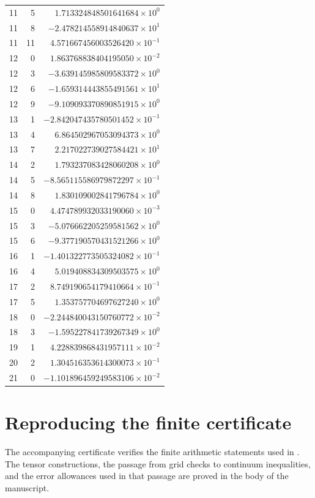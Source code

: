 \documentclass[11pt]{article}
\numberwithin{equation}{section}
\theoremstyle{definition}
\theoremstyle{remark}
\begin{document}
\begin{longtable}{rrr}
11 & 5 & $1.713324848501641684\times10^{0}$ \\
11 & 8 & $-2.478214558914840637\times10^{1}$ \\
11 & 11 & $4.571667456003526420\times10^{-1}$ \\
12 & 0 & $1.863768838404195050\times10^{-2}$ \\
12 & 3 & $-3.639145985809583372\times10^{0}$ \\
12 & 6 & $-1.659314443855491561\times10^{1}$ \\
12 & 9 & $-9.109093370890851915\times10^{0}$ \\
13 & 1 & $-2.842047435780501452\times10^{-1}$ \\
13 & 4 & $6.864502967053094373\times10^{0}$ \\
13 & 7 & $2.217022739027584421\times10^{1}$ \\
14 & 2 & $1.793237083428060208\times10^{0}$ \\
14 & 5 & $-8.565115586979872297\times10^{-1}$ \\
14 & 8 & $1.830109002841796784\times10^{0}$ \\
15 & 0 & $4.474789932033190060\times10^{-3}$ \\
15 & 3 & $-5.076662205259581562\times10^{0}$ \\
15 & 6 & $-9.377190570431521266\times10^{0}$ \\
16 & 1 & $-1.401322773505324082\times10^{-1}$ \\
16 & 4 & $5.019408834309503575\times10^{0}$ \\
17 & 2 & $8.749190654179410664\times10^{-1}$ \\
17 & 5 & $1.353757704697627240\times10^{0}$ \\
18 & 0 & $-2.244840043150760772\times10^{-2}$ \\
18 & 3 & $-1.595227841739267349\times10^{0}$ \\
19 & 1 & $4.228839868431957111\times10^{-2}$ \\
20 & 2 & $1.304516353614300073\times10^{-1}$ \\
21 & 0 & $-1.101896459249583106\times10^{-2}$ \\
\bottomrule
\end{longtable}
\endgroup

\section{Reproducing the finite certificate}
\label{cert:reproducibility}

The accompanying certificate verifies the finite arithmetic statements used in
.  The tensor constructions, the passage from grid checks
to continuum inequalities, and the error allowances used in that passage are
proved in the body of the manuscript.
\end{document}
